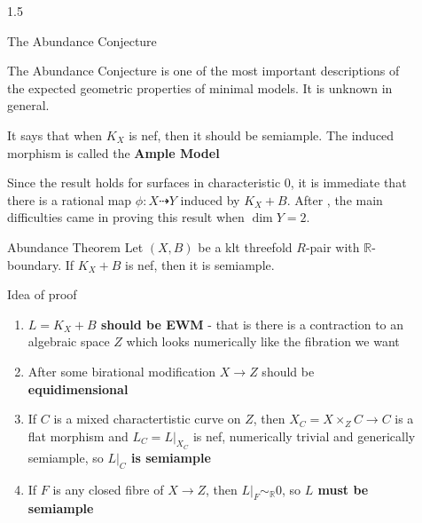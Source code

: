 \documentclass[final]{beamer}
\newlength{\sepwidth}
\newlength{\colwidth}
\newcommand{\separatorcolumn}{\begin{column}{\sepwidth}\end{column}}
\begin{document}
\begin{frame}[t, fragile]
\begin{columns}[t]
\begin{column}{\colwidth}
		\end{column}
		
		\separatorcolumn
		
		\begin{column}{1.5\colwidth}
			
			
			
			\begin{block}{The Abundance Conjecture}
				
				The Abundance Conjecture is one of the most important descriptions of the expected geometric properties of minimal models. It is unknown in general.
				
				It says that when $K_{X}$ is nef, then it should be semiample. The induced morphism is called the \textbf{Ample Model}
				
				Since the result holds for surfaces in characteristic $0$, it is immediate that there is a rational map $\phi: X \dashrightarrow Y$ induced by $K_{X}+B$. After \cite{bhatt2020}, the main difficulties came in proving this result when $\dim Y =2$.
				
			\end{block}
			
			
			\begin{alertblock}{Abundance Theorem}
				Let $(X,B)$ be a klt threefold $R$-pair with $\mathbb{R}$-boundary. If $K_X+B$ is nef, then it is semiample.
			\end{alertblock}  
			
			\begin{block}{Idea of proof}
				
				\begin{enumerate}
					\item \textbf{$L=K_{X}+B$ should be EWM} - that is there is a contraction to an algebraic space $Z$ which looks numerically like the fibration we want \\
					\item After some birational modification $X \to Z$ should be \textbf{equidimensional}\\
					\item If $C$ is a mixed charactertistic curve on $Z$, then $X_{C}=X\times_{Z} C \to C$ is a flat morphism and $L_{C}=L|_{X_{C}}$ is nef, numerically trivial and generically semiample, so \textbf{$L|_{C}$ is semiample}
					\item If $F$ is any closed fibre of $X \to Z$, then \textbf{$L|_{F} \sim_{\mathbb{R}} 0$}, so \textbf{$L$ must be semiample}
				\end{enumerate}
				

\end{block}
\end{column}
\end{columns}
\end{frame}
\end{document}
